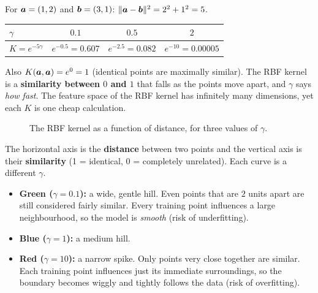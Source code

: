 \begin{example}
For $\boldsymbol{a}=(1,2)$ and $\boldsymbol{b}=(3,1)$: $\|\boldsymbol{a}-\boldsymbol{b}\|^2=2^2+1^2=5$.
\begin{center}
\begin{tabular}{@{}lccc@{}}
\toprule
$\gamma$ & $0.1$ & $0.5$ & $2$\\
\midrule
$K=e^{-5\gamma}$ & $e^{-0.5}=0.607$ & $e^{-2.5}=0.082$ & $e^{-10}=0.00005$\\
\bottomrule
\end{tabular}
\end{center}
Also $K(\boldsymbol{a},\boldsymbol{a})=e^{0}=1$ (identical points are maximally similar). The RBF kernel is a \textbf{similarity between $0$ and $1$} that falls as the points move apart, and $\gamma$ says \emph{how fast}. The feature space of the RBF kernel has infinitely many dimensions, yet each $K$ is one cheap calculation.
\end{example}

\begin{figure}[!htbp]
\centering
{}
\caption{The RBF kernel as a function of distance, for three values of $\gamma$.}\label{fig:rbfgamma}
\end{figure}

\begin{explain}
The horizontal axis is the \textbf{distance} between two points and the vertical axis is their \textbf{similarity} (1 = identical, 0 = completely unrelated). Each curve is a different $\gamma$.

\begin{itemize}
  \item \textbf{Green ($\gamma=0.1$):} a wide, gentle hill. Even points that are $2$ units apart are still considered fairly similar. Every training point influences a large neighbourhood, so the model is \emph{smooth} (risk of underfitting).
  \item \textbf{Blue ($\gamma=1$):} a medium hill.
  \item \textbf{Red ($\gamma=10$):} a narrow spike. Only points very close together are similar. Each training point influences just its immediate surroundings, so the boundary becomes wiggly and tightly follows the data (risk of overfitting).
\end{itemize}
\end{explain}

